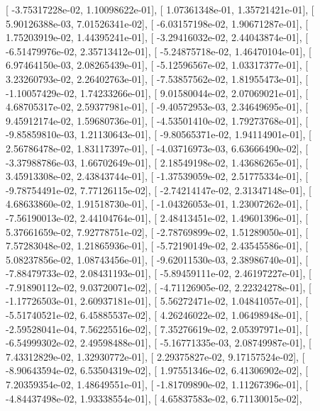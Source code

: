 \documentclass{article}
\begin{document}
       [ -3.75317228e-02,   1.10098622e-01],
       [  1.07361348e-01,   1.35721421e-01],
       [  5.90126388e-03,   7.01526341e-02],
       [ -6.03157198e-02,   1.90671287e-01],
       [  1.75203919e-02,   1.44395241e-01],
       [ -3.29416032e-02,   2.44043874e-01],
       [ -6.51479976e-02,   2.35713412e-01],
       [ -5.24875718e-02,   1.46470104e-01],
       [  6.97464150e-03,   2.08265439e-01],
       [ -5.12596567e-02,   1.03317377e-01],
       [  3.23260793e-02,   2.26402763e-01],
       [ -7.53857562e-02,   1.81955473e-01],
       [ -1.10057429e-02,   1.74233266e-01],
       [  9.01580044e-02,   2.07069021e-01],
       [  4.68705317e-02,   2.59377981e-01],
       [ -9.40572953e-03,   2.34649695e-01],
       [  9.45912174e-02,   1.59680736e-01],
       [ -4.53501410e-02,   1.79273768e-01],
       [ -9.85859810e-03,   1.21130643e-01],
       [ -9.80565371e-02,   1.94114901e-01],
       [  2.56786478e-02,   1.83117397e-01],
       [ -4.03716973e-03,   6.63666490e-02],
       [ -3.37988786e-03,   1.66702649e-01],
       [  2.18549198e-02,   1.43686265e-01],
       [  3.45913308e-02,   2.43843744e-01],
       [ -1.37539059e-02,   2.51775334e-01],
       [ -9.78754491e-02,   7.77126115e-02],
       [ -2.74214147e-02,   2.31347148e-01],
       [  4.68633860e-02,   1.91518730e-01],
       [ -1.04326053e-01,   1.23007262e-01],
       [ -7.56190013e-02,   2.44104764e-01],
       [  2.48413451e-02,   1.49601396e-01],
       [  5.37661659e-02,   7.92778751e-02],
       [ -2.78769899e-02,   1.51289050e-01],
       [  7.57283048e-02,   1.21865936e-01],
       [ -5.72190149e-02,   2.43545586e-01],
       [  5.08237856e-02,   1.08743456e-01],
       [ -9.62011530e-03,   2.38986740e-01],
       [ -7.88479733e-02,   2.08431193e-01],
       [ -5.89459111e-02,   2.46197227e-01],
       [ -7.91890112e-02,   9.03720071e-02],
       [ -4.71126905e-02,   2.22324278e-01],
       [ -1.17726503e-01,   2.60937181e-01],
       [  5.56272471e-02,   1.04841057e-01],
       [ -5.51740521e-02,   6.45885537e-02],
       [  4.26246022e-02,   1.06498948e-01],
       [ -2.59528041e-04,   7.56225516e-02],
       [  7.35276619e-02,   2.05397971e-01],
       [ -6.54999302e-02,   2.49598488e-01],
       [ -5.16771335e-03,   2.08749987e-01],
       [  7.43312829e-02,   1.32930772e-01],
       [  2.29375827e-02,   9.17157524e-02],
       [ -8.90643594e-02,   6.53504319e-02],
       [  1.97551346e-02,   6.41306902e-02],
       [  7.20359354e-02,   1.48649551e-01],
       [ -1.81709890e-02,   1.11267396e-01],
       [ -4.84437498e-02,   1.93338554e-01],
       [  4.65837583e-02,   6.71130015e-02],
\end{document}
